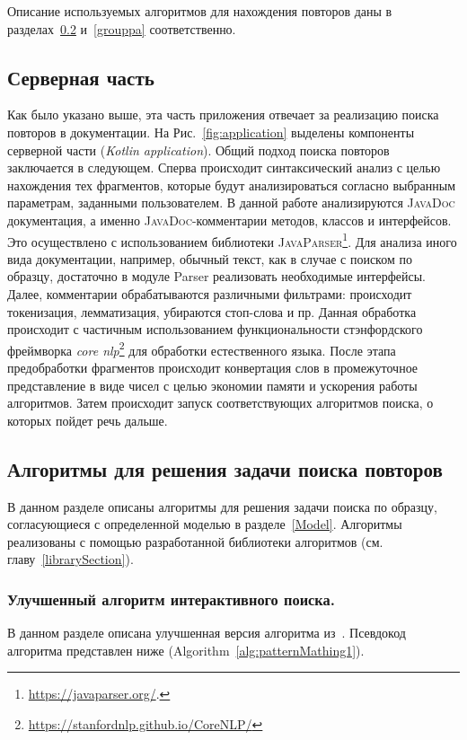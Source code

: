 Описание используемых алгоритмов для нахождения повторов даны в разделах~\ref{fics} и~\ref{grouppa} соответственно.


\subsection{Серверная часть}\label{server}
Как было указано выше, эта часть приложения отвечает за реализацию поиска повторов в документации.
На Рис.~\ref{fig:application} выделены компоненты серверной части (\emph{Kotlin application}).
Общий подход поиска повторов заключается в следующем.
Сперва происходит синтаксический анализ с целью нахождения тех фрагментов, которые будут анализироваться согласно выбранным параметрам, заданными пользователем.
В данной работе анализируются \textsc{JavaDoc} документация, а именно \textsc{JavaDoc}-комментарии методов, классов и интерфейсов.
Это осуществлено с использованием библиотеки \textsc{JavaParser}\footnote{\url{https://javaparser.org/}.}.
Для анализа иного вида документации, например, обычный текст, как в случае с поиском по образцу, достаточно в модуле Parser реализовать необходимые интерфейсы.
Далее, комментарии обрабатываются различными фильтрами: происходит токенизация, лемматизация, убираются стоп-слова и пр.
Данная обработка происходит с частичным использованием функциональности стэнфордского фреймворка \emph{core nlp}\footnote{\url{https://stanfordnlp.github.io/CoreNLP/}} для обработки естественного языка.
После этапа предобработки фрагментов происходит конвертация слов в промежуточное представление в виде чисел с целью экономии памяти и ускорения работы алгоритмов.
Затем происходит запуск соответствующих алгоритмов поиска, о которых пойдет речь дальше.


\subsection{Алгоритмы для решения задачи поиска повторов}\label{fics}

В данном разделе описаны алгоритмы для решения задачи поиска по образцу, согласующиеся с определенной моделью в разделе~\ref{Model}.
Алгоритмы реализованы с помощью разработанной библиотеки алгоритмов (см. главу~\ref{librarySection}).

\subsubsection{Улучшенный алгоритм интерактивного поиска.}
В данном разделе описана улучшенная версия алгоритма из~\cite{luciv2019interactive}.
Псевдокод алгоритма представлен ниже (Algorithm~\ref{alg:patternMathing1}).


